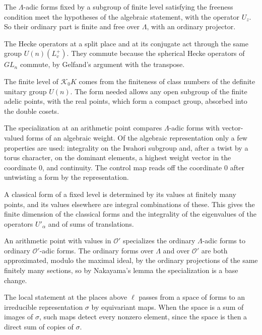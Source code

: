 The $\Lambda$-adic forms fixed by a subgroup of finite level satisfying the freeness condition meet the hypotheses of the algebraic statement, with the operator $U_z$. So their ordinary part is finite and free over $\Lambda$, with an ordinary projector.

The Hecke operators at a split place and at its conjugate act through the same group $U(n)(L^+_v)$. They commute because the spherical Hecke operators of $GL_n$ commute, by Gelfand's argument with the transpose.

The finite level of $\mathcal K_0K$ comes from the finiteness of class numbers of the definite unitary group $U(n)$. The form needed allows any open subgroup of the finite adelic points, with the real points, which form a compact group, absorbed into the double cosets.

The specialization at an arithmetic point compares $\Lambda$-adic forms with vector-valued forms of an algebraic weight. Of the algebraic representation only a few properties are used: integrality on the Iwahori subgroup and, after a twist by a torus character, on the dominant elements, a highest weight vector in the coordinate $0$, and continuity. The control map reads off the coordinate $0$ after untwisting a form by the representation.

A classical form of a fixed level is determined by its values at finitely many points, and its values elsewhere are integral combinations of these. This gives the finite dimension of the classical forms and the integrality of the eigenvalues of the operators $U'_\alpha$ and of sums of translations.

An arithmetic point with values in $\mathcal O'$ specializes the ordinary $\Lambda$-adic forms to ordinary $\mathcal O'$-adic forms. The ordinary forms over $\Lambda$ and over $\mathcal O'$ are both approximated, modulo the maximal ideal, by the ordinary projections of the same finitely many sections, so by Nakayama's lemma the specialization is a base change.

The local statement at the places above $\ell$ passes from a space of forms to an irreducible representation $\sigma$ by equivariant maps. When the space is a sum of images of $\sigma$, such maps detect every nonzero element, since the space is then a direct sum of copies of $\sigma$.

